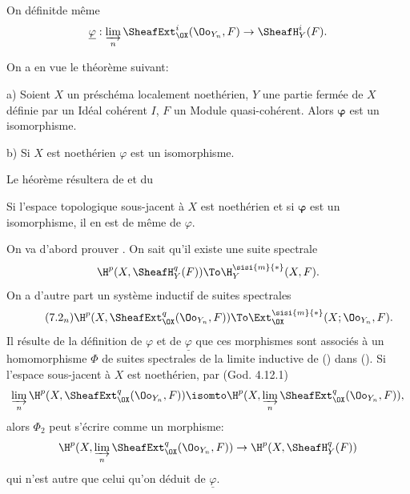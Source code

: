 \enlargethispage{\baselineskip}%
On d\'efinit\pageoriginale de m\^eme
$$
\underline{\varphi}: \varinjlim_{n} \SheafExt_{\OX}^i(\Oo_{Y_n}, F) \to {\SheafH}_Y^i(F).
$$

On a en vue le th\'eor\`eme suivant:

\begin{suptheoreme} \label{II.6} \textup{a)}
Soient $X$ un pr\'esch\'ema localement noeth\'erien, $Y$ une partie ferm\'ee de $X$ d\'efinie par un Id\'eal coh\'erent $I$, $F$ un Module quasi-coh\'erent. Alors $\boldsymbol{\varphi}$ est un isomorphisme.

\textup{b)} Si $X$ est noeth\'erien $\varphi$ est un isomorphisme.
\end{suptheoreme}

Le h\'eor\`eme  r\'esultera de  et du

\begin{suplemme} \label{II.7} Si l'espace topologique sous-jacent \`a $X$ est noeth\'erien et si $\boldsymbol{\varphi}$ est un isomorphisme, il en est de m\^eme de $\varphi$.
\end{suplemme}

On va d'abord prouver . On sait qu'il existe une suite spectrale
\begin{equation} \label{eq:II.7.1}
\H^p(X, {\SheafH}_Y^q(F)) \To \H_Y^{\sisi{m}{\ast}}(X, F).
\end{equation}
On a d'autre part un syst\`eme inductif de suites spectrales
\begin{equation*} \label{eq:II.7.2n} \tag{7.2$_n$}\stepcounter{equation}
\H^p(X, {\SheafExt}_{\OX}^q(\Oo_{Y_n}, F)) \To \Ext_{\OX}^{\sisi{m}{\ast}}(X;\Oo_{Y_n}, F).
\end{equation*}
Il r\'esulte de la d\'efinition de $\varphi$ et de $\underline{\varphi}$ que ces morphismes sont associ\'es \`a un homomorphisme $\Phi$ de suites spectrales de la limite inductive de () dans (). Si l'espace sous-jacent \`a $X$ est noeth\'erien, par (God. 4.12.1)
\begin{equation*}
\varinjlim_{n} \H^p(X, {\SheafExt}_{\OX}^q(\Oo_{Y_n}, F))\isomto \H^p(X, \varinjlim_{n} {\SheafExt}_{\OX}^q(\Oo_{Y_n}, F)),
\end{equation*}
alors $\Phi_2$ peut s'\'ecrire comme un morphisme:
\begin{equation*} \H^p(X, \varinjlim_{n} {\SheafExt}_{\OX}^q(\Oo_{Y_n}, F)) \to \H^p(X, {\SheafH}_Y^q(F))
\end{equation*}
qui n'est autre que celui qu'on d\'eduit de $\underline{\varphi}$.

